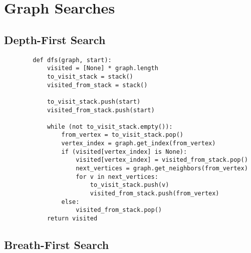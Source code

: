 \newpage

\section[Day 6: Graph Searches]{ Graph Searches }

\subsection{ Depth-First Search }

    \begin{lstlisting}
        def dfs(graph, start):
            visited = [None] * graph.length
            to_visit_stack = stack()
            visited_from_stack = stack()
            
            to_visit_stack.push(start)
            visited_from_stack.push(start)
            
            while (not to_visit_stack.empty()):
                from_vertex = to_visit_stack.pop()
                vertex_index = graph.get_index(from_vertex)
                if (visited[vertex_index] is None):
                    visited[vertex_index] = visited_from_stack.pop()
                    next_vertices = graph.get_neighbors(from_vertex)
                    for v in next_vertices:
                        to_visit_stack.push(v)
                        visited_from_stack.push(from_vertex)
                else:
                    visited_from_stack.pop()
            return visited
    \end{lstlisting}





\subsection{ Breath-First Search }

